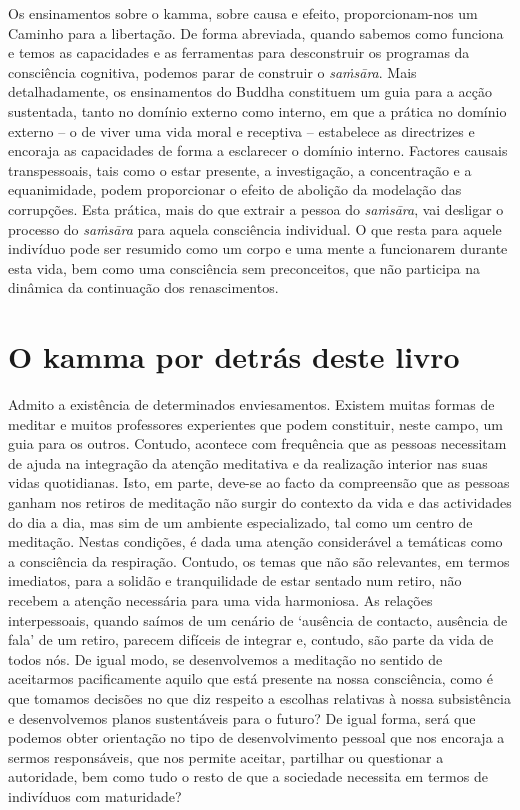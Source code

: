 Os ensinamentos sobre o kamma, sobre causa e efeito, proporcionam-nos um Caminho
para a libertação. De forma abreviada, quando sabemos como funciona e temos as
capacidades e as ferramentas para desconstruir os programas da consciência
cognitiva, podemos parar de construir o \emph{saṁsāra}. Mais detalhadamente, os
ensinamentos do Buddha constituem um guia para a acção sustentada, tanto no
domínio externo como interno, em que a prática no domínio externo -- o de viver
uma vida moral e receptiva -- estabelece as directrizes e encoraja as
capacidades de forma a esclarecer o domínio interno. Factores causais
transpessoais, tais como o estar presente, a investigação, a concentração e a
equanimidade, podem proporcionar o efeito de abolição da modelação das
corrupções. Esta prática, mais do que extrair a pessoa do \emph{saṁsāra}, vai
desligar o processo do \emph{saṁsāra} para aquela consciência individual. O que
resta para aquele indivíduo pode ser resumido como um corpo e uma mente a
funcionarem durante esta vida, bem como uma consciência sem preconceitos, que
não participa na dinâmica da continuação dos renascimentos.

\section{O kamma por detrás deste livro}

Admito a existência de determinados enviesamentos. Existem muitas formas de
meditar e muitos professores experientes que podem constituir, neste campo, um
guia para os outros. Contudo, acontece com frequência que as pessoas necessitam
de ajuda na integração da atenção meditativa e da realização interior nas suas
vidas quotidianas. Isto, em parte, deve-se ao facto da compreensão que as
pessoas ganham nos retiros de meditação não surgir do contexto da vida e das
actividades do dia a dia, mas sim de um ambiente especializado, tal como um
centro de meditação. Nestas condições, é dada uma atenção considerável a
temáticas como a consciência da respiração. Contudo, os temas que não são
relevantes, em termos imediatos, para a solidão e tranquilidade de estar sentado
num retiro, não recebem a atenção necessária para uma vida harmoniosa. As
relações interpessoais, quando saímos de um cenário de `ausência de contacto,
ausência de fala' de um retiro, parecem difíceis de integrar e, contudo, são
parte da vida de todos nós. De igual modo, se desenvolvemos a meditação no
sentido de aceitarmos pacificamente aquilo que está presente na nossa
consciência, como é que tomamos decisões no que diz respeito a escolhas
relativas à nossa subsistência e desenvolvemos planos sustentáveis para o
futuro? De igual forma, será que podemos obter orientação no tipo de
desenvolvimento pessoal que nos encoraja a sermos responsáveis, que nos permite
aceitar, partilhar ou questionar a autoridade, bem como tudo o resto de que a
sociedade necessita em termos de indivíduos com maturidade?

